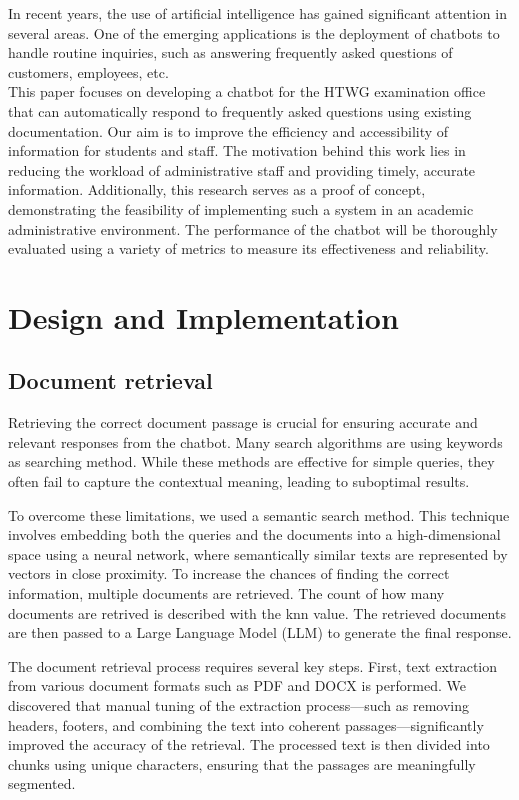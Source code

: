 \documentclass[conference]{IEEEtran}
\begin{document}
In recent years, the use of artificial intelligence has gained significant attention in several areas. One of the emerging applications is the deployment of chatbots to handle routine inquiries, such as answering frequently asked questions of customers, employees, etc. \\
This paper focuses on developing a chatbot for the HTWG examination office that can automatically respond to frequently asked questions using existing documentation. Our aim is to improve the efficiency and accessibility of information for students and staff. The motivation behind this work lies in reducing the workload of administrative staff and providing timely, accurate information. Additionally, this research serves as a proof of concept, demonstrating the feasibility of implementing such a system in an academic administrative environment. The performance of the chatbot will be thoroughly evaluated using a variety of metrics to measure its effectiveness and reliability.

\section{Design and Implementation}

\subsection{Document retrieval}
Retrieving the correct document passage is crucial for ensuring accurate and relevant responses from the chatbot. Many search algorithms are using keywords as searching method. While these methods are effective for simple queries, they often fail to capture the contextual meaning, leading to suboptimal results.

To overcome these limitations, we used a semantic search method. This technique involves embedding both the queries and the documents into a high-dimensional space using a neural network, where semantically similar texts are represented by vectors in close proximity. To increase the chances of finding the correct information, multiple documents are retrieved. The count of how many documents are retrived is described with the \acrfull{knn} value. The retrieved documents are then passed to a Large Language Model (LLM) to generate the final response.

The document retrieval process requires several key steps. First, text extraction from various document formats such as PDF and DOCX is performed. We discovered that manual tuning of the extraction process—such as removing headers, footers, and combining the text into coherent passages—significantly improved the accuracy of the retrieval. The processed text is then divided into chunks using unique characters, ensuring that the passages are meaningfully segmented.
\end{document}
